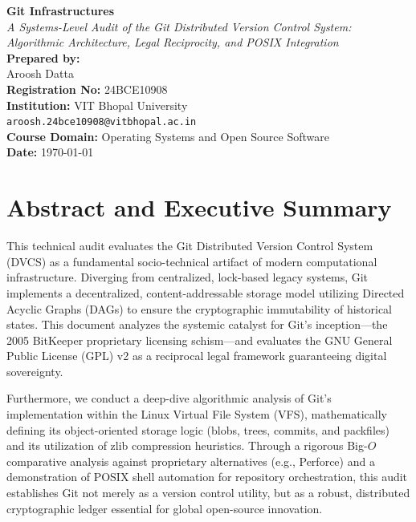 \documentclass[11pt, a4paper]{article}
\begin{document}
\begin{titlepage}
    \centering
    \vspace*{3cm}
    \Huge \textbf{Git Infrastructures} \\
    \vspace{0.7cm}
    \Large \textit{A Systems-Level Audit of the Git Distributed Version Control System: \\ Algorithmic Architecture, Legal Reciprocity, and POSIX Integration} \\
    \vfill
    \large
    \textbf{Prepared by:} \\
    Aroosh Datta \\
    \textbf{Registration No:} 24BCE10908 \\
    \textbf{Institution:} VIT Bhopal University \\
    \texttt{aroosh.24bce10908@vitbhopal.ac.in} \\
    \vspace{1cm}
    \textbf{Course Domain:} Operating Systems and Open Source Software \\
    \vfill
    \textbf{Date:} \today
\end{titlepage}

\newpage
\section*{Abstract and Executive Summary}
This technical audit evaluates the Git Distributed Version Control System (DVCS) as a fundamental socio-technical artifact of modern computational infrastructure. Diverging from centralized, lock-based legacy systems, Git implements a decentralized, content-addressable storage model utilizing Directed Acyclic Graphs (DAGs) to ensure the cryptographic immutability of historical states. This document analyzes the systemic catalyst for Git's inception—the 2005 BitKeeper proprietary licensing schism—and evaluates the GNU General Public License (GPL) v2 as a reciprocal legal framework guaranteeing digital sovereignty. 

Furthermore, we conduct a deep-dive algorithmic analysis of Git's implementation within the Linux Virtual File System (VFS), mathematically defining its object-oriented storage logic (blobs, trees, commits, and packfiles) and its utilization of zlib compression heuristics. Through a rigorous Big-$O$ comparative analysis against proprietary alternatives (e.g., Perforce) and a demonstration of POSIX shell automation for repository orchestration, this audit establishes Git not merely as a version control utility, but as a robust, distributed cryptographic ledger essential for global open-source innovation.

\newpage
\tableofcontents
\newpage





\newpage

\end{document}
